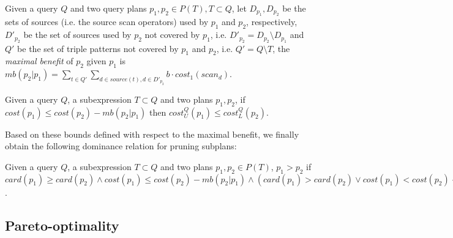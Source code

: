   
\begin{definition}
  Given a query $Q$ and two query plans $p_1,p_2 \in P(T), T \subset Q$, let $D_{p_1},D_{p_2}$ be the sets of sources (i.e. the source scan operators) used by $p_1$ and $p_2$, respectively, $D'_{p_2}$ be the set of sources used by $p_2$ not covered by $p_1$, i.e. $D'_{p_2} = D_{p_2} \setminus D_{p_1}$ and $Q'$ be the set of triple patterns not covered by $p_1$ and $p_2$, i.e. $Q' = Q \setminus T$, the \emph{maximal benefit} of $p_2$ given $p_1$ is $mb(p_2|p_1) = \sum_{t \in Q'}
  \sum_{d \in source(t), d \in D'_{p_2} } b \cdot cost_1(scan_d)$.
\end{definition}

\begin{lemma}
  \label{def:estimated_bound}
  Given a query $Q$, a subexpression $T \subset Q$ and two plans $p_1,p_2$, if $cost(p_1) \leq cost(p_2) - mb(p_2|p_1)$ then $cost_U^Q(p_1) \leq cost_L^Q(p_2)$.
\end{lemma}

%
  
Based on these bounds defined with respect to the maximal benefit, we finally obtain the following dominance relation for
pruning subplans:

\begin{theorem}
  Given a query $Q$, a subexpression $T \subset Q$ and two plans
  $p_1,p_2 \in P(T)$, $p_1 > p_2$ if
  $card(p_1) \geq card(p_2) \wedge cost(p_1) \leq cost(p_2) -
  mb(p_2|p_1) \wedge (card(p_1) > card(p_2) \vee cost(p_1) <
  cost(p_2) - mb(p_2|p_1))$.
\end{theorem}


\subsection{Pareto-optimality}
\label{sec:pareto}

